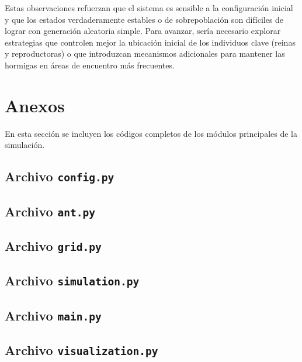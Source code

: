 \documentclass[12pt,a4paper]{article}
\begin{document}
Estas observaciones refuerzan que el sistema es sensible a la configuración inicial y que los estados verdaderamente estables o de sobrepoblación son difíciles de lograr con generación aleatoria simple. Para avanzar, sería necesario explorar estrategias que controlen mejor la ubicación inicial de los individuos clave (reinas y reproductoras) o que introduzcan mecanismos adicionales para mantener las hormigas en áreas de encuentro más frecuentes.

\section{Anexos}
En esta sección se incluyen los códigos completos de los módulos principales de la simulación.

\subsection{Archivo \texttt{config.py}}


\subsection{Archivo \texttt{ant.py}}


\subsection{Archivo \texttt{grid.py}}


\subsection{Archivo \texttt{simulation.py}}


\subsection{Archivo \texttt{main.py}}


\subsection{Archivo \texttt{visualization.py}}

\end{document}
